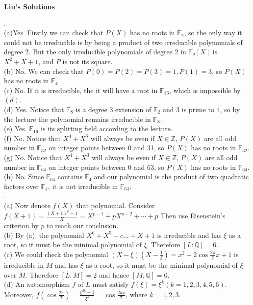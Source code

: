 \documentclass[11pt,a4paper]{ctexart}
\begin{document}
\begin{center}
\Large\textbf{Liu's Solutions}
\end{center}
.\\
(a)Yes. Firstly we can check that $P(X)$ has no roots in $\mathbb{F}_2$, so the only way it could not be irreducible is by being a product of two irreducible polynomials of degree 2. But the only irreducible polynomials of degree 2 in $\mathbb{F}_2[X]$ is $X^2+X+1$, and $P$ is not its square.\\
(b) No. We can check that $P(0)=P(2)=P(3)=1,P(1)=3$, so $P(X)$ has no roots in $\mathbb{F}_4$.\\
(c) No. If it is irreducible, the it will have a root in $\mathbb{F}_{16}$, which is impossible by $(d)$.\\
(d) Yes. Notice that $\mathbb{F}_8$ is a degree 3 extension of $\mathbb{F}_2$ and 3 is prime to 4, so by the lecture the polynomial remains irreducible in $\mathbb{F}_8$.\\
(e) Yes. $\mathbb{F}_{16}$ is its splitting field according to the lecture.\\
(f) No. Notice that $X^4+X^3$ will always be even if $X\in\mathbb{Z}$, $P(X)$ are all odd number in $\mathbb{F}_{32}$ on integer points between 0 and 31, so $P(X)$ has no roots in $\mathbb{F}_{32}$.\\
(g) No. Notice that $X^4+X^3$ will always be even if $X\in\mathbb{Z}$, $P(X)$ are all odd number in $\mathbb{F}_{64}$ on integer points between 0 and 63, so $P(X)$ has no roots in $\mathbb{F}_{64}$.\\
(h) No. Since $\mathbb{F}_{64}$ contains $\mathbb{F}_4$ and our polynomial is the product of two quadratic factors over $\mathbb{F}_4$, it is not irreducible in $\mathbb{F}_{64}$.\vspace{10mm}\\

.\\
(a) Now denote $f(X)$ that polynomial. Consider
$f(X+1)=\frac{(X+1)^p-1}{X}=X^{p-1}+p X^{p-2}+\cdots+p$
Then use Eisenstein's criterion by $p$ to reach our conclusion.\\
(b) By (a), the polynomial $X^6+X^5+c\dots+X+1$ is irreducible and has $\xi$ as a root, so it must be the minimal polynomial of $\xi$. Therefore $[L:\mathbb{Q}]=6$.\\
(c) We could check the polynomial $(X-\xi)(X-\frac{1}{\xi})=x^2-2\cos{\frac{2\pi}{7}}x+1$ is irreducible in $M$ and has $\xi$ as a root, so it must be the minimal polynomial of $\xi$ over $M$. Therefore $[L:M]=2$ and hence $[M,\mathbb{Q}]=6$.\\
(d) An automorphism $f$ of $L$ must satisfy $f(\xi)=\xi^k(k=1,2,3,4,5,6)$. Moreover, $f(\cos{\frac{2\pi}{7}})=\frac{\xi^{2k}+1}{\xi^k}=\cos{\frac{2k\pi}{7}}$, where $k=1,2,3$.\vspace{10mm}\\
\end{document}
